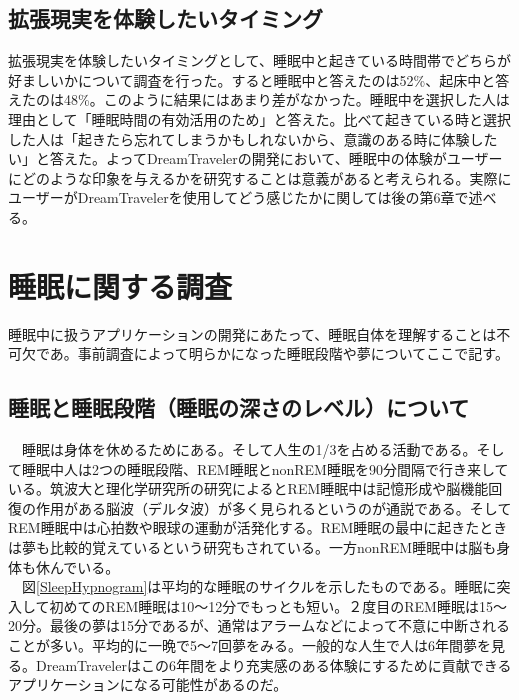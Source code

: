 \subsection{拡張現実を体験したいタイミング }
拡張現実を体験したいタイミングとして、睡眠中と起きている時間帯でどちらが好ましいかについて調査を行った。すると睡眠中と答えたのは52\%、起床中と答えたのは48\%。このように結果にはあまり差がなかった。睡眠中を選択した人は理由として「睡眠時間の有効活用のため」と答えた。比べて起きている時と選択した人は「起きたら忘れてしまうかもしれないから、意識のある時に体験したい」と答えた。よってDreamTravelerの開発において、睡眠中の体験がユーザーにどのような印象を与えるかを研究することは意義があると考えられる。実際にユーザーがDreamTravelerを使用してどう感じたかに関しては後の第6章で述べる。

\section{睡眠に関する調査}
睡眠中に扱うアプリケーションの開発にあたって、睡眠自体を理解することは不可欠であ。事前調査によって明らかになった睡眠段階や夢についてここで記す。

\subsection{睡眠と睡眠段階（睡眠の深さのレベル）について}
　睡眠は身体を休めるためにある。そして人生の1/3を占める活動である。そして睡眠中人は2つの睡眠段階、REM睡眠とnonREM睡眠を90分間隔で行き来している\cite{Dement}。筑波大と理化学研究所の研究によるとREM睡眠中は記憶形成や脳機能回復の作用がある脳波（デルタ波）が多く見られるというのが通説である\cite{tsukuba}。そしてREM睡眠中は心拍数や眼球の運動が活発化する。REM睡眠の最中に起きたときは夢も比較的覚えているという研究もされている\cite{remNonRem}。一方nonREM睡眠中は脳も身体も休んでいる。\\
　図\ref{SleepHypnogram}は平均的な睡眠のサイクルを示したものである。睡眠に突入して初めてのREM睡眠は10〜12分でもっとも短い。２度目のREM睡眠は15〜20分。最後の夢は15分であるが、通常はアラームなどによって不意に中断されることが多い。平均的に一晩で5〜7回夢をみる。一般的な人生で人は6年間夢を見る。DreamTravelerはこの6年間をより充実感のある体験にするために貢献できるアプリケーションになる可能性があるのだ。

